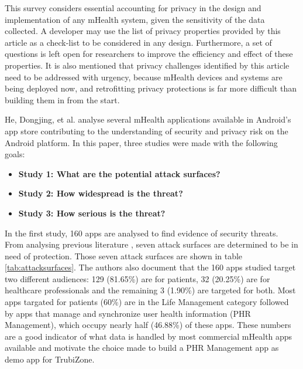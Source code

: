 
This survey considers essential accounting for privacy in the design and implementation of any mHealth system, given the sensitivity of the data collected. A developer may use the list of privacy properties provided by this article as a check-list to be considered in any design. Furthermore, a set of questions is left open for researchers to improve the efficiency and effect of these properties. It is also mentioned that privacy challenges identified by this article need to be addressed with urgency, because mHealth devices and systems are being deployed now, and retrofitting privacy protections is far more difficult than building them in from the start.

He, Dongjing, et al. \cite{he2014security} analyse several mHealth applications available in Android's app store contributing to the understanding of security and privacy risk on the Android platform. In this paper, three studies were made with the following goals:

\begin{itemize}
	\item \textbf{Study 1: What are the potential attack surfaces?}
	\item \textbf{Study 2: How widespread is the threat?}
	\item \textbf{Study 3: How serious is the threat?}
\end{itemize}

In the first study, 160 apps are analysed to find evidence of security threats. From analysing previous literature \cite{zhou2013identity,naveed2014inside,aviv2012practicality,cai2012practicality,chin2011analyzing,fsecure}, seven attack surfaces are determined to be in need of protection. Those seven attack surfaces are shown in table \ref{tab:attacksurfaces}. The authors also document that the 160 apps studied target two different audiences: 129 (81.65\%) are for patients, 32 (20.25\%) are for healthcare professionals and the remaining 3 (1.90\%) are targeted for both. Most apps targated for patients (60\%) are in the Life Management category followed by apps that manage and synchronize user health information (\ac{PHR} Management), which occupy nearly half (46.88\%) of these apps. These numbers are a good indicator of what data is handled by most commercial mHealth apps available and motivate the choice made to build a \ac{PHR} Management app as demo app for TrubiZone.

